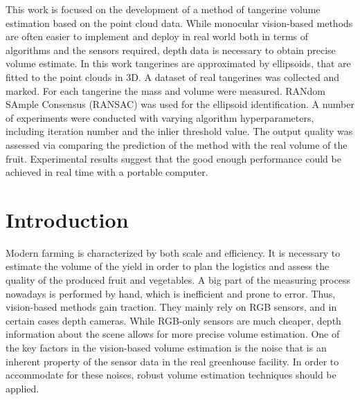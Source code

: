

This work is focused on the development of a method of tangerine volume estimation based on the point cloud data.
While monocular vision-based methods are often easier to implement and deploy in real world both in terms of algorithms and the sensors required, depth data is necessary to obtain precise volume estimate.
In this work tangerines are approximated by ellipsoids, that are fitted to the point clouds in 3D.
A dataset of real tangerines was collected and marked.
For each tangerine the mass and volume were measured.
RANdom SAmple Consensus (RANSAC) was used for the ellipsoid identification.
A number of experiments were conducted with varying algorithm hyperparameters, including iteration number and the inlier threshold value.
The output quality was assessed via comparing the prediction of the method with the real volume of the fruit.
Experimental results suggest that the good enough performance could be achieved in real time with a portable computer.


\section{Introduction}

Modern farming is characterized by both scale and efficiency.
It is necessary to estimate the volume of the yield in order to plan the logistics and assess the quality of the produced fruit and vegetables.
A big part of the measuring process nowadays is performed by hand, which is inefficient and prone to error.
Thus, vision-based methods gain traction.
They mainly rely on RGB sensors, and in certain cases depth cameras.
While RGB-only sensors are much cheaper, depth information about the scene allows for more precise volume estimation.
One of the key factors in the vision-based volume estimation is the noise that is an inherent property of the sensor data in the real greenhouse facility.
In order to accommodate for these noises, robust volume estimation techniques should be applied.


